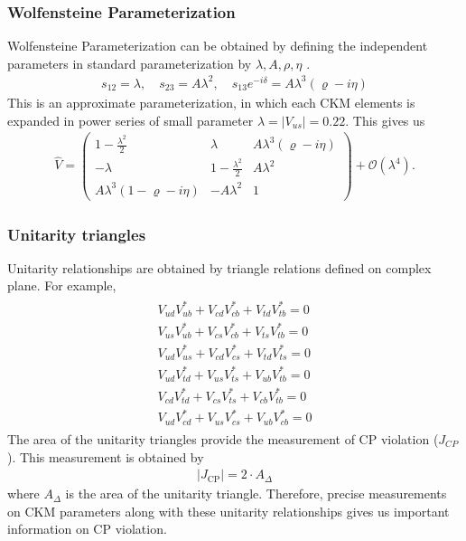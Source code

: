 \subsubsection{Wolfensteine Parameterization}
Wolfensteine Parameterization can be obtained by defining the independent parameters in standard parameterization by $\lambda, A, \rho, \eta$ \cite{Buras:1994ec}.
\begin{eqnarray}
s_{12}=\lambda, \quad s_{23}=A \lambda^{2}, \quad s_{13} e^{-i \delta}=A \lambda^{3}(\varrho-i \eta)
\end{eqnarray}
This is an approximate parameterization, in which each CKM elements is expanded in power series of small parameter $\lambda = |V_{us}|=0.22$. This gives us 
\begin{eqnarray}
\hat{V}=\left(\begin{array}{ccc}{1-\frac{\lambda^{2}}{2}} & {\lambda} & {A \lambda^{3}(\varrho-i \eta)} \\ {-\lambda} & {1-\frac{\lambda^{2}}{2}} & {A \lambda^{2}} \\ {A \lambda^{3}(1-\varrho-i \eta)} & {-A \lambda^{2}} & {1}\end{array}\right)+\mathcal{O}\left(\lambda^{4}\right).
\end{eqnarray}
\subsubsection{Unitarity triangles}
Unitarity relationships are obtained by triangle relations defined on complex plane. For example, 
\begin{eqnarray}
\begin{array}{l}{V_{u d} V_{u b}^{*}+V_{c d} V_{c b}^{*}+V_{t d} V_{t b}^{*}=0} \\ {V_{u  s} V_{u  b}^{*}+V_{c s} V_{c b}^{*}+V_{t s} V_{t b}^{*}=0} \\ {V_{u d } V_{u s}^{*}+V_{c d} V_{c s}^{*}+V_{t d} V_{t s}^{*}=0} \\ {V_{u d} V_{t d}^{*}+V_{u s} V_{t s}^{*}+V_{u b} V_{t b}^{*}=0} \\ {V_{c d} V_{t d}^{*}+V_{c s} V_{t s}^{*}+V_{c b} V_{t b}^{*}=0} \\ {V_{u d } V_{c d}^{*}+V_{u s} V_{c s}^{*}+V_{u b} V_{c b}^{*}=0}\end{array}
\end{eqnarray}
The area of the unitarity triangles provide the measurement of CP violation ($J_{CP}$). This measurement is obtained by\cite{Jarlskog:1988ii} 
\begin{eqnarray}
\left|J_{\mathrm{CP}}\right|=2 \cdot A_{\Delta}
\end{eqnarray}
where $A_{\Delta}$ is the area of the unitarity triangle. Therefore, precise measurements on CKM parameters along with these unitarity relationships gives us important information on CP violation. 
